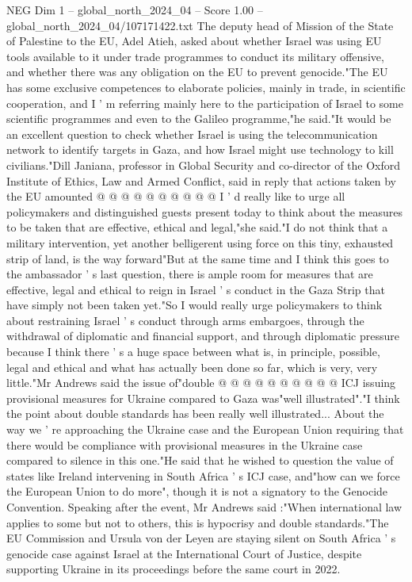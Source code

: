 \begin{textsample}{NEG Dim 1 – global\_north\_2024\_04 – Score 1.00 – global\_north\_2024\_04/107171422.txt}
The deputy head of Mission of the State of Palestine to the EU, Adel Atieh, asked about whether Israel was using EU tools available to it under trade programmes to conduct its military offensive, and whether there was any obligation on the EU to prevent genocide."The EU has some exclusive competences to elaborate policies, mainly in trade, in scientific cooperation, and I ' m referring mainly here to the participation of Israel to some scientific programmes and even to the Galileo programme,"he said."It would be an excellent question to check whether Israel is using the telecommunication network to identify targets in Gaza, and how Israel might use technology to kill civilians."Dill Janiana, professor in Global Security and co-director of the Oxford Institute of Ethics, Law and Armed Conflict, said in reply that actions taken by the EU amounted @ @ @ @ @ @ @ @ @ @ I ' d really like to urge all policymakers and distinguished guests present today to think about the measures to be taken that are effective, ethical and legal,"she said."I do not think that a military intervention, yet another belligerent using force on this tiny, exhausted strip of land, is the way forward"But at the same time and I think this goes to the ambassador ' s last question, there is ample room for measures that are effective, legal and ethical to reign in Israel ' s conduct in the Gaza Strip that have simply not been taken yet."So I would really urge policymakers to think about restraining Israel ' s conduct through arms embargoes, through the withdrawal of diplomatic and financial support, and through diplomatic pressure because I think there ' s a huge space between what is, in principle, possible, legal and ethical and what has actually been done so far, which is very, very little."Mr Andrews said the issue of"double @ @ @ @ @ @ @ @ @ @ ICJ issuing provisional measures for Ukraine compared to Gaza was"well illustrated"."I think the point about double standards has been really well illustrated...
About the way we ' re approaching the Ukraine case and the European Union requiring that there would be compliance with provisional measures in the Ukraine case compared to silence in this one."He said that he wished to question the value of states like Ireland intervening in South Africa ' s ICJ case, and"how can we force the European Union to do more", though it is not a signatory to the Genocide Convention.
Speaking after the event, Mr Andrews said :"When international law applies to some but not to others, this is hypocrisy and double standards."The EU Commission and Ursula von der Leyen are staying silent on South Africa ' s genocide case against Israel at the International Court of Justice, despite supporting Ukraine in its proceedings before the same court in 2022.

\end{textsample}
